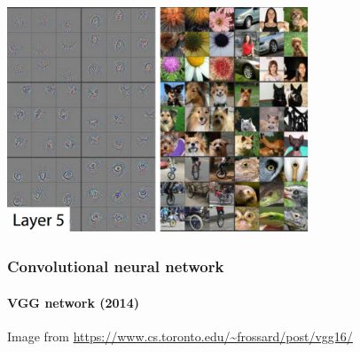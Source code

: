 \documentclass[9pt]{beamer}
\begin{document}
\begin{frame}
\begin{center}
\begin{overprint}
       \includegraphics[width = 9cm]{images/cnn_vizu_l5.jpg}
    \end{overprint}
  \end{center}

\end{frame}

\begin{frame}

  \frametitle{Convolutional neural network}
  
  \framesubtitle{VGG network (2014)}

  \begin{center}
  \end{center}

  {\small Image from \url{https://www.cs.toronto.edu/~frossard/post/vgg16/}}
\end{frame}
\end{document}
